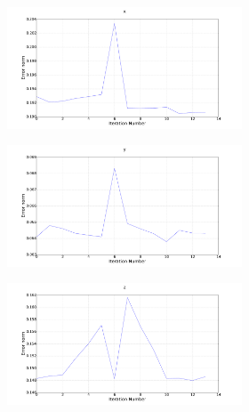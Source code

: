 \begin{figure}
  \centering
  \begin{subfigure}{0.48\textwidth}
    \begin{subfigure}{\textwidth}
      \includegraphics[clip, trim = 100 0 100 0, width=\textwidth]{figures/chapter3/err_x}
    \end{subfigure}
    \begin{subfigure}{\textwidth}
      \includegraphics[clip, trim = 100 0 100 0, width=\textwidth]{figures/chapter3/err_y}
    \end{subfigure}
    \begin{subfigure}{\textwidth}
      \includegraphics[clip, trim = 100 0 100 0, width=\textwidth]{figures/chapter3/err_z}

\end{subfigure}
\end{subfigure}
\end{figure}
